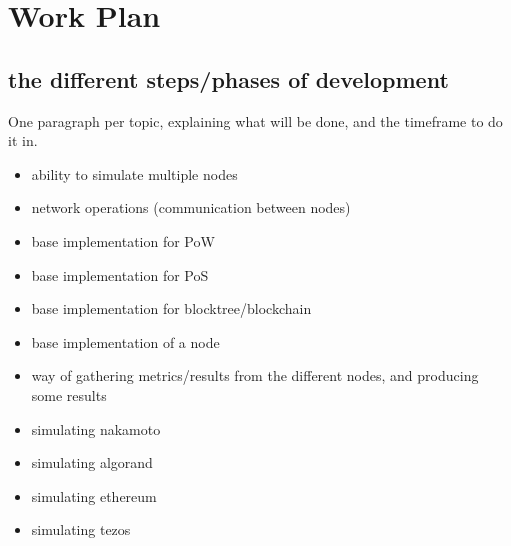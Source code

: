 

\chapter{Work Plan}
\label{cha:work_plan}

\section{the different steps/phases of development}

One paragraph per topic, explaining what will be done, and the timeframe to do it in.

\begin{itemize}
    \item ability to simulate multiple nodes 
    \item network operations (communication between nodes)
    \item base implementation for PoW
    \item base implementation for PoS
    \item base implementation for blocktree/blockchain
    \item base implementation of a node
    \item way of gathering metrics/results from the different nodes, and producing some results
    \item simulating nakamoto
    \item simulating algorand
    \item simulating ethereum
    \item simulating tezos
\end{itemize}